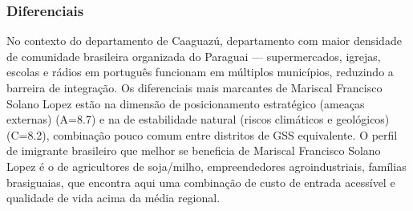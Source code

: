 \subsubsection*{Diferenciais}\label{dif-mariscal-francisco-solano-lopez-0516}
No contexto do departamento de Caaguazú, departamento com maior densidade de comunidade brasileira organizada do Paraguai — supermercados, igrejas, escolas e rádios em português funcionam em múltiplos municípios, reduzindo a barreira de integração. Os diferenciais mais marcantes de Mariscal Francisco Solano Lopez estão na dimensão de posicionamento estratégico (ameaças externas) (A=8.7) e na de estabilidade natural (riscos climáticos e geológicos) (C=8.2), combinação pouco comum entre distritos de GSS equivalente. O perfil de imigrante brasileiro que melhor se beneficia de Mariscal Francisco Solano Lopez é o de agricultores de soja/milho, empreendedores agroindustriais, famílias brasiguaias, que encontra aqui uma combinação de custo de entrada acessível e qualidade de vida acima da média regional.
